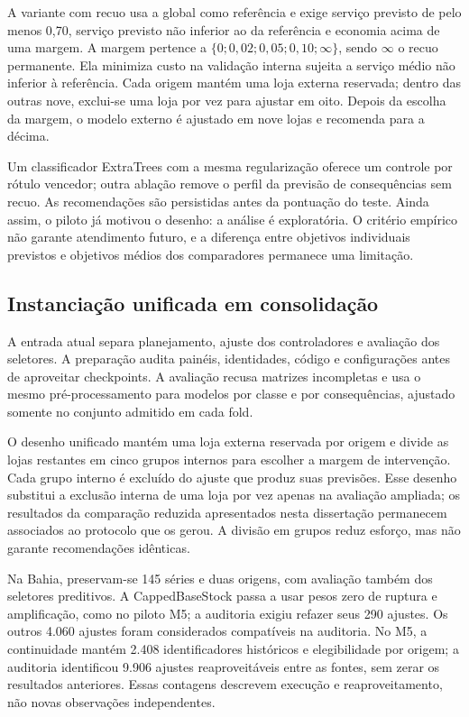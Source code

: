 A variante com recuo usa a global como referência e exige serviço previsto de pelo menos 0,70, serviço previsto não inferior ao da referência e economia acima de uma margem. A margem pertence a $\{0;0{,}02;0{,}05;0{,}10;\infty\}$, sendo $\infty$ o recuo permanente. Ela minimiza custo na validação interna sujeita a serviço médio não inferior à referência. Cada origem mantém uma loja externa reservada; dentro das outras nove, exclui-se uma loja por vez para ajustar em oito. Depois da escolha da margem, o modelo externo é ajustado em nove lojas e recomenda para a décima.

Um classificador ExtraTrees com a mesma regularização oferece um controle por rótulo vencedor; outra ablação remove o perfil da previsão de consequências sem recuo. As recomendações são persistidas antes da pontuação do teste. Ainda assim, o piloto já motivou o desenho: a análise é exploratória. O critério empírico não garante atendimento futuro, e a diferença entre objetivos individuais previstos e objetivos médios dos comparadores permanece uma limitação.

\subsection{Instanciação unificada em consolidação}
A entrada atual separa planejamento, ajuste dos controladores e avaliação dos seletores. A preparação audita painéis, identidades, código e configurações antes de aproveitar checkpoints. A avaliação recusa matrizes incompletas e usa o mesmo pré-processamento para modelos por classe e por consequências, ajustado somente no conjunto admitido em cada fold.

O desenho unificado mantém uma loja externa reservada por origem e divide as lojas restantes em cinco grupos internos para escolher a margem de intervenção. Cada grupo interno é excluído do ajuste que produz suas previsões. Esse desenho substitui a exclusão interna de uma loja por vez apenas na avaliação ampliada; os resultados da comparação reduzida apresentados nesta dissertação permanecem associados ao protocolo que os gerou. A divisão em grupos reduz esforço, mas não garante recomendações idênticas.

Na Bahia, preservam-se 145 séries e duas origens, com avaliação também dos seletores preditivos. A CappedBaseStock passa a usar pesos zero de ruptura e amplificação, como no piloto M5; a auditoria exigiu refazer seus 290 ajustes. Os outros 4.060 ajustes foram considerados compatíveis na auditoria. No M5, a continuidade mantém 2.408 identificadores históricos e elegibilidade por origem; a auditoria identificou 9.906 ajustes reaproveitáveis entre as fontes, sem zerar os resultados anteriores. Essas contagens descrevem execução e reaproveitamento, não novas observações independentes.

